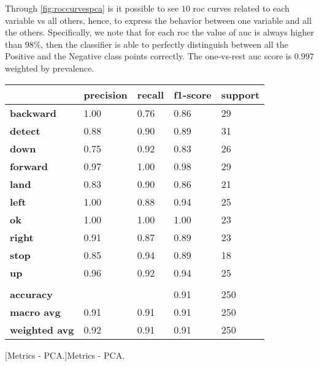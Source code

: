 \noindent Through \ref{fig:roccurvespca} is it possible to see $10$ \gls{roc} curves related to each variable vs all others, hence, to express the behavior between one variable and all the others. Specifically, we note that for each \gls{roc} the value of \gls{auc} is always higher than $98\%$, then the classifier is able to perfectly distinguish between all the Positive and the Negative class points correctly. The one-vs-rest \gls{auc} score is $0.997$ weighted by prevalence. \\

\begin{table}[H]
	\centering
    \begin{tabular}{|l|l|l|l|l|}
        \hline
        \textbf{}             & \textbf{precision} & \textbf{recall} & \textbf{f1-score} & \textbf{support} \\ \hline
        \textbf{backward}     & 1.00               & 0.76            & 0.86              & 29               \\ \hline
        \textbf{detect}       & 0.88               & 0.90            & 0.89              & 31               \\ \hline
        \textbf{down}         & 0.75               & 0.92            & 0.83              & 26               \\ \hline
        \textbf{forward}      & 0.97               & 1.00            & 0.98              & 29               \\ \hline
        \textbf{land}         & 0.83               & 0.90            & 0.86              & 21               \\ \hline
        \textbf{left}         & 1.00               & 0.88            & 0.94              & 25               \\ \hline
        \textbf{ok}           & 1.00               & 1.00            & 1.00              & 23               \\ \hline
        \textbf{right}        & 0.91               & 0.87            & 0.89              & 23               \\ \hline
        \textbf{stop}         & 0.85               & 0.94            & 0.89              & 18               \\ \hline
        \textbf{up}           & 0.96               & 0.92            & 0.94              & 25               \\ \hline
                              &                    &                 &                   &                  \\ \hline
        \textbf{accuracy}     &                    &                 & 0.91              & 250              \\ \hline
        \textbf{macro avg}    & 0.91               & 0.91            & 0.91              & 250              \\ \hline
        \textbf{weighted avg} & 0.92               & 0.91            & 0.91              & 250              \\ \hline
        \end{tabular}
	[Metrics - PCA.]{Metrics - PCA.}
    \label{tab:pca}
\end{table}

